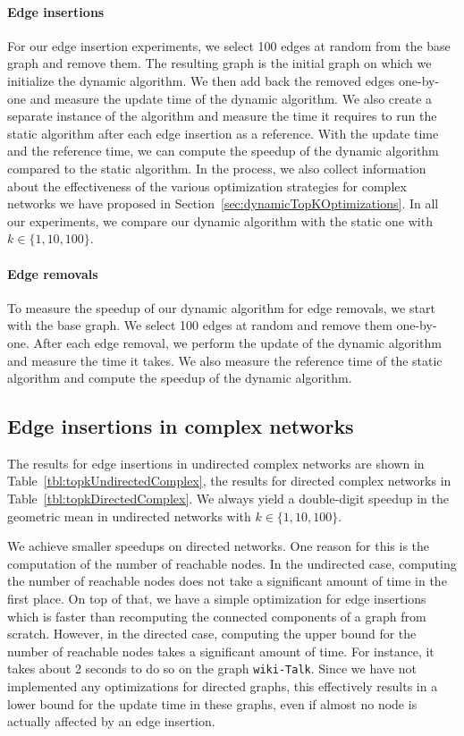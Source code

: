 \paragraph{Edge insertions}
For our edge insertion experiments, we select 100 edges at random from the base graph and remove them. The resulting graph is the initial graph on which we initialize the dynamic algorithm. We then add back the removed edges one-by-one and measure the update time of the dynamic algorithm. We also create a separate instance of the algorithm and measure the time it requires to run the static algorithm after each edge insertion as a reference. With the update time and the reference time, we can compute the speedup of the dynamic algorithm compared to the static algorithm. In the process, we also collect information about the effectiveness of the various optimization strategies for complex networks we have proposed in Section~\ref{sec:dynamicTopKOptimizations}. In all our experiments, we compare our dynamic algorithm with the static one with  $k \in \{1, 10, 100\}$.

\paragraph{Edge removals}
To measure the speedup of our dynamic algorithm for edge removals, we start with the base graph. We select 100 edges at random and remove them one-by-one. After each edge removal, we perform the update of the dynamic algorithm and measure the time it takes. We also measure the reference time of the static algorithm and compute the speedup of the dynamic algorithm.

\subsection{Edge insertions in complex networks}
The results for edge insertions in undirected complex networks are shown in Table~\ref{tbl:topkUndirectedComplex}, the results for directed complex networks in Table~\ref{tbl:topkDirectedComplex}. We always yield a double-digit speedup in the geometric mean in undirected networks with  $k \in \{1, 10, 100\}$.

We achieve smaller speedups on directed networks. One reason for this is the computation of the number of reachable nodes. In the undirected case, computing the number of reachable nodes does not take a significant amount of time in the first place. On top of that, we have a simple optimization for edge insertions which is faster than recomputing the connected components of a graph from scratch. However, in the directed case, computing the upper bound for the number of reachable nodes takes a significant amount of time. For instance, it takes about 2 seconds to do so on the graph \texttt{wiki-Talk}. Since we have not implemented any optimizations for directed graphs, this effectively results in a lower bound for the update time in these graphs, even if almost no node is actually affected by an edge insertion.


